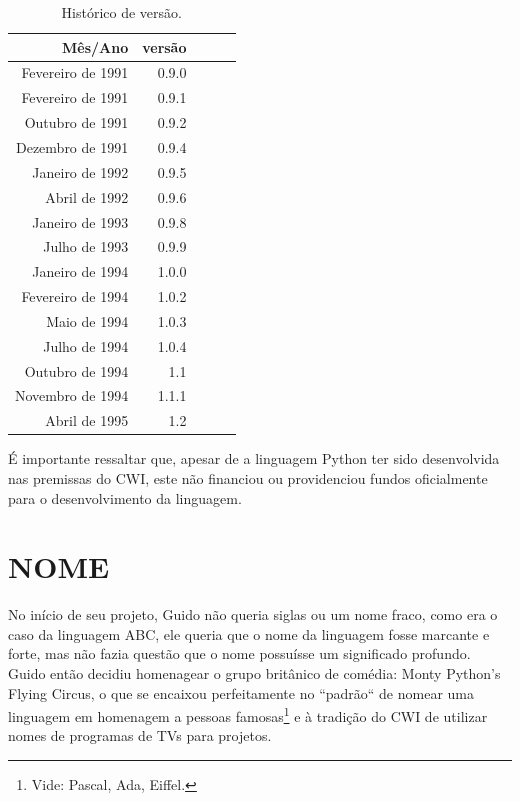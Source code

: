 \begin{table}[!htb]
    \centering
    \caption[Histórico de versão]{Histórico de versão.
    \label{tab:Historico-versao}}
    \begin{tabular}{rrrrr}
        \toprule
        Mês/Ano & versão \\
        \midrule
            Fevereiro de 1991 & 0.9.0  \\
            Fevereiro de 1991 & 0.9.1  \\
            Outubro de 1991 & 0.9.2  \\
            Dezembro de 1991 & 0.9.4  \\
            Janeiro de 1992 & 0.9.5  \\
            Abril de 1992 & 0.9.6  \\
            Janeiro de 1993 & 0.9.8  \\
            Julho de 1993 & 0.9.9  \\
            Janeiro de 1994 & 1.0.0  \\
            Fevereiro de 1994 & 1.0.2  \\
            Maio de 1994 & 1.0.3  \\
            Julho de 1994 & 1.0.4  \\
            Outubro de 1994 & 1.1  \\
            Novembro de 1994 & 1.1.1  \\
            Abril de 1995 & 1.2  \\
        \bottomrule
    \end{tabular}
\end{table}

É importante ressaltar que, apesar de a linguagem Python ter sido desenvolvida nas premissas do CWI, este não financiou ou providenciou fundos oficialmente para o desenvolvimento da linguagem.

\section{NOME}

No início de seu projeto, Guido não queria siglas ou um nome fraco, como era o caso da linguagem ABC, ele queria que o nome da linguagem fosse marcante e forte, mas não fazia questão que o nome possuísse um significado profundo.
Guido então decidiu homenagear o grupo britânico de comédia: Monty Python’s Flying Circus, o que se encaixou perfeitamente no “padrão“ de nomear uma linguagem em homenagem a pessoas famosas\footnote{
    Vide: Pascal, Ada, Eiffel.
} e à tradição do CWI de utilizar nomes de programas de TVs para projetos.
 
